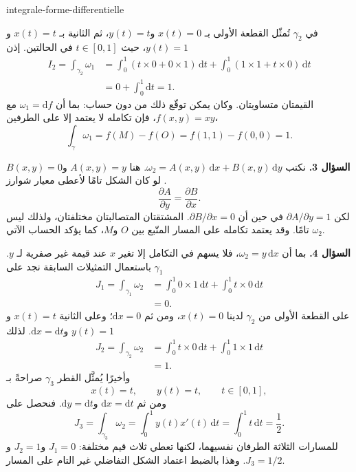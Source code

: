 \begin{exo}{integrale-forme-differentielle}
\begin{solution}
في $\gamma_2$ تُمثّل القطعة الأولى بـ $x(t)=0$ و$y(t)=t$، ثم الثانية بـ
$x(t)=t$ و$y(t)=1$، حيث $t\in[0,1]$ في الحالتين. إذن
\[
\begin{aligned}
I_2
= \int_{\gamma_2}\omega_1
&= \int_0^1\left(t\times 0+0\times 1\right)\,\mathrm{d}t
 + \int_0^1\left(1\times 1+t\times 0\right)\,\mathrm{d}t \\
&= 0+\int_0^1\mathrm{d}t = 1.
\end{aligned}
\]
القيمتان متساويتان. وكان يمكن توقّع ذلك من دون حساب: بما أن
$\omega_1=\mathrm{d}f$ مع $f(x,y)=xy$، فإن تكامله لا يعتمد إلا على الطرفين،
\[
\int_\gamma\omega_1=f(M)-f(O)=f(1,1)-f(0,0)=1.
\]

\textbf{السؤال 3.} نكتب $\omega_2=A(x,y)\,\mathrm{d}x+B(x,y)\,\mathrm{d}y$.
هنا $A(x,y)=y$ و$B(x,y)=0$. لو كان الشكل تامًا لأعطى معيار شوارز
\[
\frac{\partial A}{\partial y}=\frac{\partial B}{\partial x}.
\]
لكن $\partial A/\partial y=1$ في حين أن $\partial B/\partial x=0$.
المشتقتان المتصالبتان مختلفتان، ولذلك ليس $\omega_2$ تامًا. وقد يعتمد تكامله
على المسار المتّبع بين $O$ و$M$، كما يؤكد الحساب الآتي.

\textbf{السؤال 4.} بما أن $\omega_2=y\,\mathrm{d}x$، فلا يسهم في التكامل إلا
تغير $x$ عند قيمة غير صفرية لـ $y$. باستعمال التمثيلات السابقة نجد على $\gamma_1$
\[
\begin{aligned}
J_1
=\int_{\gamma_1}\omega_2
&=\int_0^1 0\times 1\,\mathrm{d}t
  +\int_0^1 t\times 0\,\mathrm{d}t \\
&=0.
\end{aligned}
\]
على القطعة الأولى من $\gamma_2$ لدينا $x(t)=0$، ومن ثم $\mathrm{d}x=0$؛
وعلى الثانية $x(t)=t$ و$y(t)=1$ و$\mathrm{d}x=\mathrm{d}t$. لذلك
\[
\begin{aligned}
J_2
=\int_{\gamma_2}\omega_2
&=\int_0^1 t\times 0\,\mathrm{d}t
  +\int_0^1 1\times 1\,\mathrm{d}t \\
&=1.
\end{aligned}
\]
وأخيرًا يُمثَّل القطر $\gamma_3$ صراحةً بـ
\[
x(t)=t,\qquad y(t)=t,\qquad t\in[0,1],
\]
ومن ثم $\mathrm{d}x=\mathrm{d}t$ و$\mathrm{d}y=\mathrm{d}t$. فنحصل على
\[
J_3
=\int_{\gamma_3}\omega_2
=\int_0^1 y(t)x'(t)\,\mathrm{d}t
=\int_0^1 t\,\mathrm{d}t
=\frac12.
\]
للمسارات الثلاثة الطرفان نفسيهما، لكنها تعطي ثلاث قيم مختلفة:
$J_1=0$ و$J_2=1$ و$J_3=1/2$. وهذا بالضبط اعتماد الشكل التفاضلي غير التام على المسار.
\end{solution}
\end{exo}

